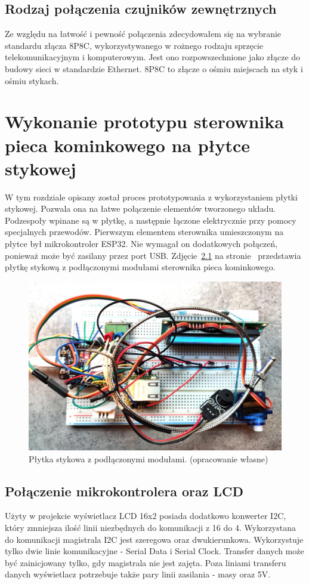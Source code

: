 \documentclass[11pt]{report}
\begin{document}
 \section{Rodzaj połączenia czujników zewnętrznych}
 Ze względu na łatwość i pewność połączenia zdecydowałem się na wybranie standardu złącza 8P8C, wykorzystywanego w rożnego rodzaju sprzęcie telekomunikacyjnym i komputerowym. Jest ono rozpowszechnione jako złącze do budowy sieci w standardzie Ethernet. 8P8C to złącze o ośmiu miejscach na styk i ośmiu stykach.
 
 
 \chapter{Wykonanie prototypu sterownika pieca kominkowego na płytce stykowej}\label{ch:prototyp:stykowa}
 W tym rozdziale opisany został proces prototypowania z wykorzystaniem płytki stykowej.
 Pozwala ona na łatwe połączenie elementów tworzonego układu. Podzespoły wpinane są w płytkę, a następnie łączone elektrycznie przy pomocy specjalnych przewodów.
 Pierwszym elementem sterownika umieszczonym na płytce był mikrokontroler ESP32. Nie wymagał on dodatkowych połączeń, ponieważ może być zasilany przez port USB.
    Zdjęcie~\ref{fig:stykowa} na stronie~\pageref{fig:stykowa} przedstawia płytkę stykową z podłączonymi modułami sterownika pieca kominkowego.
    \begin{figure}[ht]
\centering
\includegraphics[width=0.8 \textwidth]{fig/plytka_stykowa.jpg}
\caption{Płytka stykowa z podłączonymi modułami. (opracowanie własne)}
\label{fig:stykowa}
\end{figure}
  
 \section{Połączenie mikrokontrolera oraz LCD}
 Użyty w projekcie wyświetlacz LCD 16x2 posiada dodatkowo konwerter I2C, który zmniejsza ilość linii niezbędnych do komunikacji z 16 do 4. Wykorzystana do komunikacji magistrala I2C jest szeregowa oraz dwukierunkowa. Wykorzystuje tylko dwie linie komunikacyjne - Serial Data i Serial Clock. Transfer danych może być zainicjowany tylko, gdy magistrala nie jest zajęta. Poza liniami transferu danych wyświetlacz potrzebuje także pary linii zasilania - masy oraz 5V.
  
\end{document}
